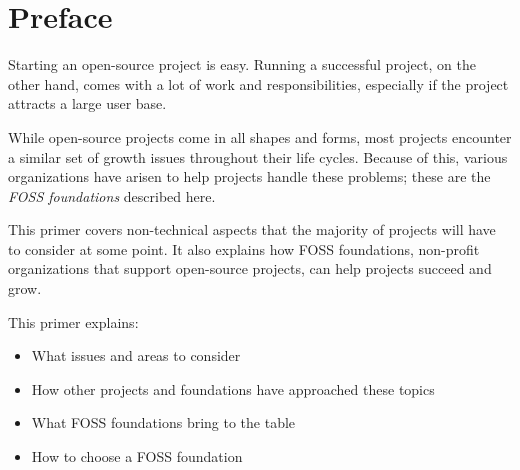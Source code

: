 


\chapter*{Preface}

Starting an open-source project is easy.  Running a successful project, on the other hand, comes with a lot of work and responsibilities, especially if the project attracts a large user base.

While open-source projects come in all shapes and forms, most projects encounter a similar set of growth issues throughout their life cycles.  Because of this, various organizations have arisen to help projects handle these problems; these are the \textit{FOSS foundations} described here.

This primer covers non-technical aspects that the majority of projects will have to consider at some point.  It also explains how FOSS foundations, non-profit organizations that support open-source projects, can help projects succeed and grow.

This primer explains:

\begin{itemize}

\item What issues and areas to consider

\item How other projects and foundations have approached these topics

\item What FOSS foundations bring to the table

\item How to choose a FOSS foundation

\end{itemize}

